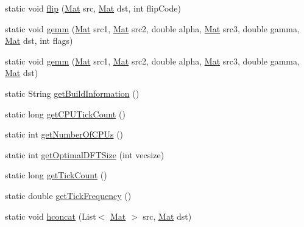 \begin{DoxyCompactItemize}
\item 
static void \mbox{\hyperlink{classorg_1_1opencv_1_1core_1_1_core_a8dc68bbfca84b4fdfb9cd7bd79fc893e}{flip}} (\mbox{\hyperlink{classorg_1_1opencv_1_1core_1_1_mat}{Mat}} src, \mbox{\hyperlink{classorg_1_1opencv_1_1core_1_1_mat}{Mat}} dst, int flip\+Code)
\item 
static void \mbox{\hyperlink{classorg_1_1opencv_1_1core_1_1_core_a68aea4eb6784b0aaa0f5c0770fa7bde0}{gemm}} (\mbox{\hyperlink{classorg_1_1opencv_1_1core_1_1_mat}{Mat}} src1, \mbox{\hyperlink{classorg_1_1opencv_1_1core_1_1_mat}{Mat}} src2, double alpha, \mbox{\hyperlink{classorg_1_1opencv_1_1core_1_1_mat}{Mat}} src3, double gamma, \mbox{\hyperlink{classorg_1_1opencv_1_1core_1_1_mat}{Mat}} dst, int flags)
\item 
static void \mbox{\hyperlink{classorg_1_1opencv_1_1core_1_1_core_ae2574392283beecd4f987326489e38c4}{gemm}} (\mbox{\hyperlink{classorg_1_1opencv_1_1core_1_1_mat}{Mat}} src1, \mbox{\hyperlink{classorg_1_1opencv_1_1core_1_1_mat}{Mat}} src2, double alpha, \mbox{\hyperlink{classorg_1_1opencv_1_1core_1_1_mat}{Mat}} src3, double gamma, \mbox{\hyperlink{classorg_1_1opencv_1_1core_1_1_mat}{Mat}} dst)
\item 
static String \mbox{\hyperlink{classorg_1_1opencv_1_1core_1_1_core_a359cc7a14c10ba08bd29761bd9ec607c}{get\+Build\+Information}} ()
\item 
static long \mbox{\hyperlink{classorg_1_1opencv_1_1core_1_1_core_a63858b4080485f600e39a29c722a7a85}{get\+C\+P\+U\+Tick\+Count}} ()
\item 
static int \mbox{\hyperlink{classorg_1_1opencv_1_1core_1_1_core_a4f58562c2297384087202e154b2b7555}{get\+Number\+Of\+C\+P\+Us}} ()
\item 
static int \mbox{\hyperlink{classorg_1_1opencv_1_1core_1_1_core_a9818ffe89dca479da8352d5bf6ebd6b3}{get\+Optimal\+D\+F\+T\+Size}} (int vecsize)
\item 
static long \mbox{\hyperlink{classorg_1_1opencv_1_1core_1_1_core_adffc76724114188de1dcad5582ce7631}{get\+Tick\+Count}} ()
\item 
static double \mbox{\hyperlink{classorg_1_1opencv_1_1core_1_1_core_afc3677eba8a0186c9b92ebfa096301ec}{get\+Tick\+Frequency}} ()
\item 
static void \mbox{\hyperlink{classorg_1_1opencv_1_1core_1_1_core_ae809cca27285b20fc31b42ffb7e5b5cb}{hconcat}} (List$<$ \mbox{\hyperlink{classorg_1_1opencv_1_1core_1_1_mat}{Mat}} $>$ src, \mbox{\hyperlink{classorg_1_1opencv_1_1core_1_1_mat}{Mat}} dst)
\item 

\end{DoxyCompactItemize}

